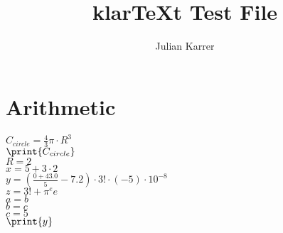 \documentclass[oneside, a4paper]{article}
\author{Julian Karrer}
\title{klarTeXt Test File}
\begin{document}
\maketitle
\section*{Arithmetic}


\begin{program}

$C_{circle} = \frac{4}{3}\pi \cdot R^3$\\
$\print{C_{circle}}$\\
$R = 2$\\
$x = 5+3\cdot 2$\\
$y = \left(\frac{0+43.0}{5}-7.2\right)\cdot 3! \cdot (-5) \cdot 10^{-8}$\\
$z = 3! + \pi^e e$\\
$a = b$\\
$b = c$\\
$c = 5$\\
$\print{y}$\\


\end{program}
\end{document}

